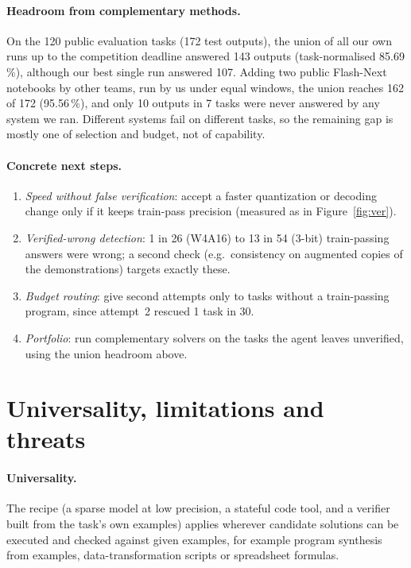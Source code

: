\documentclass[11pt]{article}
\begin{document}
\paragraph{Headroom from complementary methods.} On the 120 public evaluation tasks (172 test outputs), the union of all our own runs up to the competition deadline answered 143 outputs (task-normalised 85.69\,\%), although our best single run answered 107. Adding two public Flash-Next notebooks by other teams, run by us under equal windows, the union reaches 162 of 172 (95.56\,\%), and only 10 outputs in 7 tasks were never answered by any system we ran. Different systems fail on different tasks, so the remaining gap is mostly one of selection and budget, not of capability.

\paragraph{Concrete next steps.}
\begin{enumerate}
\item \emph{Speed without false verification}: accept a faster quantization or decoding change only if it keeps train-pass precision (measured as in Figure~\ref{fig:ver}).
\item \emph{Verified-wrong detection}: 1 in 26 (W4A16) to 13 in 54 (3-bit) train-passing answers were wrong; a second check (e.g.\ consistency on augmented copies of the demonstrations) targets exactly these.
\item \emph{Budget routing}: give second attempts only to tasks without a train-passing program, since attempt~2 rescued 1 task in 30.
\item \emph{Portfolio}: run complementary solvers on the tasks the agent leaves unverified, using the union headroom above.
\end{enumerate}

\section{Universality, limitations and threats}
\paragraph{Universality.} The recipe (a sparse model at low precision, a stateful code tool, and a verifier built from the task's own examples) applies wherever candidate solutions can be executed and checked against given examples, for example program synthesis from examples, data-transformation scripts or spreadsheet formulas.
\end{document}
